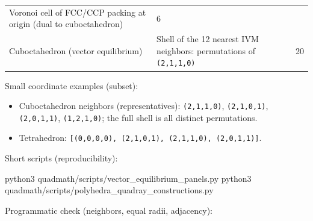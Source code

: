 \documentclass[
  10pt,
]{article}
\newenvironment{Shaded}{}{}
\newcommand{\ExtensionTok}[1]{#1}
\newcommand{\NormalTok}[1]{#1}
\providecommand{\tightlist}{%
  \setlength{\itemsep}{0pt}\setlength{\parskip}{0pt}}
\begin{document}
\begin{longtable}[]{@{}lll@{}}
\begin{minipage}[t]{0.30\columnwidth}
Voronoi cell of FCC/CCP packing at origin (dual to cuboctahedron)\strut
\end{minipage} & \begin{minipage}[t]{0.30\columnwidth}\raggedright
6\strut
\end{minipage}\tabularnewline
\begin{minipage}[t]{0.30\columnwidth}\raggedright
Cuboctahedron (vector equilibrium)\strut
\end{minipage} & \begin{minipage}[t]{0.30\columnwidth}\raggedright
Shell of the 12 nearest IVM neighbors: permutations of
\texttt{(2,1,1,0)}\strut
\end{minipage} & \begin{minipage}[t]{0.30\columnwidth}\raggedright
20\strut
\end{minipage}\tabularnewline
\bottomrule
\end{longtable}

Small coordinate examples (subset):

\begin{itemize}
\tightlist
\item
  Cuboctahedron neighbors (representatives): \texttt{(2,1,1,0)},
  \texttt{(2,1,0,1)}, \texttt{(2,0,1,1)}, \texttt{(1,2,1,0)}; the full
  shell is all distinct permutations.
\item
  Tetrahedron:
  \texttt{{[}(0,0,0,0),\ (2,1,0,1),\ (2,1,1,0),\ (2,0,1,1){]}}.
\end{itemize}

Short scripts (reproducibility):

\begin{Shaded}
\begin{Highlighting}[]
\ExtensionTok{python3}\NormalTok{ quadmath/scripts/vector\_equilibrium\_panels.py}
\ExtensionTok{python3}\NormalTok{ quadmath/scripts/polyhedra\_quadray\_constructions.py}
\end{Highlighting}
\end{Shaded}

Programmatic check (neighbors, equal radii, adjacency):
\end{document}
